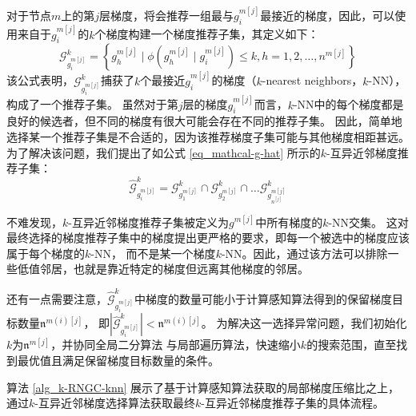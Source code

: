 \documentclass{xdupgthesis}
\begin{document}
对于节点$m$上的第$j$层梯度，将会推荐一组最与$g^{m[j]}_{i}$最接近的梯度，因此，可以使用来自于$g^{m[j]}_{i}$的$k$个梯度构建一个梯度推荐子集，其定义如下：
\begin{equation}
    \mathcal{G}_{g_{i}^{m[j]}}^{k} = \left\{
        g_{h}^{m[j]} \mid \phi\left(
            g^{m[j]}_{h} \mid g^{m[j]}_{i}
        \right) \le k, h = 1, 2, \dots, n^{m[j]}
    \right\}
\end{equation}
该公式表明，$\mathcal{G}_{g_{i}^{m[j]}}^{k}$捕获了$k$个最接近$g_{i}^{m[j]}$的梯度（$k$-nearest neighbors，$k$-NN），构成了一个推荐子集。
虽然对于第$j$层的梯度$g_{i}^{m[j]}$而言，$k$-NN中的每个梯度都是良好的候选者，但不同的梯度有很大可能会存在不同的推荐子集。
因此，简单地选择某一个推荐子集是不合适的，因为该推荐梯度子集可能与其他梯度相距甚远。
为了解决该问题，我们提出了如公式 \eqref{eq_mathcal-g-hat} 所示的$k$-互异近邻梯度推荐子集：
\begin{equation}
    \hat{\mathcal{G}}_{g_{i}^{m[j]}}^{k} = 
        \mathcal{G}_{g_{1}^{m[j]}}^{k} \cap 
        \mathcal{G}_{g_{2}^{m[j]}}^{k} \cap 
        \dots
        \mathcal{G}_{g_{n^{[j]}}^{m[j]}}^{k}
    \label{eq_mathcal-g-hat}
\end{equation}

不难发现，$k$-互异近邻梯度推荐子集被定义为$g^{m[j]}$中所有梯度的$k$-NN交集。
这对最终选择的梯度推荐子集中的梯度提出更严格的要求，即每一个被选中的梯度应该属于每个梯度的$k$-NN，
而不是某一个梯度$k$-NN。因此，通过该方法可以排除一些低值邻居，也就是靠近特定的梯度但远离其他梯度的邻居。

还有一点需要注意，$\hat{\mathcal{G}}_{g_{i}^{m[j]}}^{k}$中梯度的数量可能小于计算感知算法得到的保留梯度目标数量$\mathfrak{n}^{m(i)[j]}$，
即$\left|\hat{\mathcal{G}}_{g_{i}^{m[j]}}^{k}\right| < \mathfrak{n}^{m(i)[j]}$。
为解决这一选择异常问题，我们初始化$k$为$\mathfrak{n}^{m[j]}$，并协同全局二分算法\cite{cormen2022introduction} 与局部遍历算法，快速缩小$k$的搜索范围，直至找到最优值且满足保留梯度目标数量的条件。

算法 \ref*{alg_k-RNGC-knn} 展示了基于计算感知算法获取的局部梯度压缩比之上，
通过$k$-互异近邻梯度选择算法获取最终$k$-互异近邻梯度推荐子集的具体流程。
\end{document}
